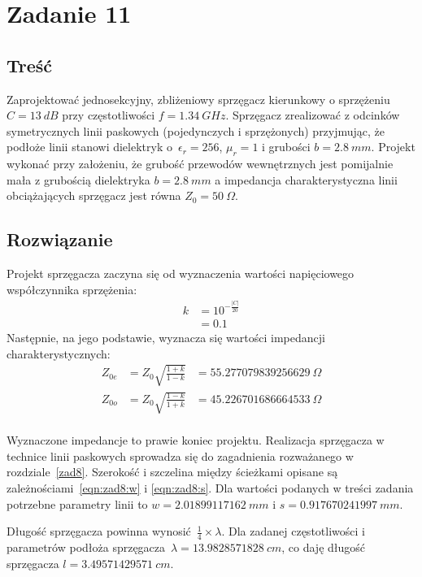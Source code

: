 \documentclass[rep.tex]{subfiles}
\begin{document}
\chapter{Zadanie 11}
\label{zad11}
\section{Treść}
Zaprojektować jednosekcyjny, zbliżeniowy sprzęgacz kierunkowy o sprzężeniu $C = 13~dB$ przy częstotliwości $f = 1.34~GHz$.
Sprzęgacz zrealizować z odcinków symetrycznych linii paskowych (pojedynczych i sprzężonych) przyjmując,
że podłoże linii stanowi dielektryk o~$\epsilon_r = 2 56$, $\mu_r = 1$ i grubości $b = 2.8~mm$.
Projekt wykonać przy założeniu, że grubość przewodów wewnętrznych jest pomijalnie mała z grubością dielektryka $b = 2.8~mm$
a impedancja charakterystyczna linii obciążających sprzęgacz jest równa $Z_0 = 50~\Omega$.

\section{Rozwiązanie}
Projekt sprzęgacza zaczyna się od wyznaczenia wartości napięciowego współczynnika sprzężenia:
\begin{align}
  k &= 10^{-\frac{|C|}{20}} \label{eqn:zad11:k} \\
  &= 0.1 \nonumber
\end{align}
Następnie, na jego podstawie, wyznacza się wartości impedancji charakterystycznych:
\begin{align}
  Z_{0e} &= Z_0\sqrt{\frac{1 + k}{1 - k}} &= 55.277079839256629~\Omega \\
  Z_{0o} &= Z_0\sqrt{\frac{1 - k}{1 + k}} &= 45.226701686664533~\Omega \\
\end{align}

Wyznaczone impedancje to prawie koniec projektu.
Realizacja sprzęgacza w technice linii paskowych sprowadza się do zagadnienia rozważanego w rozdziale~\ref{zad8}.
Szerokość i szczelina między ścieżkami opisane są zależnościami~\ref{eqn:zad8:w} i \ref{eqn:zad8:s}.
Dla wartości podanych w treści zadania potrzebne parametry linii to $w = 2.01899117162~mm$ i $s = 0.917670241997~mm$.  

Długość sprzęgacza powinna wynosić~$\frac{1}{4}\times\lambda$.
Dla zadanej częstotliwości i parametrów podłoża sprzęgacza~$\lambda = 13.9828571828~cm$, co daję długość sprzęgacza $l = 3.49571429571~cm$.
\end{document}

